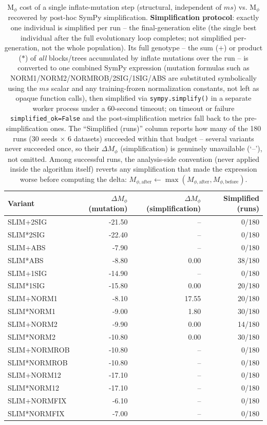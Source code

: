 \begin{table}[t]
\centering
\caption{M$_\phi$ cost of a single inflate-mutation step (structural, independent of $ms$) vs. M$_\phi$ recovered by post-hoc SymPy simplification. \textbf{Simplification protocol}: exactly one individual is simplified per run -- the final-generation elite (the single best individual after the full evolutionary loop completes; not simplified per-generation, not the whole population). Its full genotype -- the sum ($+$) or product ($*$) of \emph{all} blocks/trees accumulated by inflate mutations over the run -- is converted to one combined SymPy expression (mutation formulas such as NORM1/NORM2/NORMROB/2SIG/1SIG/ABS are substituted symbolically using the $ms$ scalar and any training-frozen normalization constants, not left as opaque function calls), then simplified via \texttt{sympy.simplify()} in a separate worker process under a 60-second timeout; on timeout or failure \texttt{simplified\_ok=False} and the post-simplification metrics fall back to the pre-simplification ones. The ``Simplified (runs)'' column reports how many of the 180 runs (30 seeds $\times$ 6 datasets) succeeded within that budget -- several variants never succeeded once, so their $\Delta M_\phi$ (simplification) is genuinely unavailable (`--'), not omitted. Among successful runs, the analysis-side convention (never applied inside the algorithm itself) reverts any simplification that made the expression worse before computing the delta: $M_{\phi,\mathrm{after}} \leftarrow \max(M_{\phi,\mathrm{after}}, M_{\phi,\mathrm{before}})$.}
\label{tab:mphi-mutation-simplification}
\begin{tabular}{lrrr}
\toprule
Variant & $\Delta M_\phi$ (mutation) & $\Delta M_\phi$ (simplification) & Simplified (runs) \\
\midrule
SLIM+2SIG & -21.50 & -- & 0/180 \\
SLIM*2SIG & -22.40 & -- & 0/180 \\
SLIM+ABS & -7.90 & -- & 0/180 \\
SLIM*ABS & -8.80 & 0.00 & 38/180 \\
SLIM+1SIG & -14.90 & -- & 0/180 \\
SLIM*1SIG & -15.80 & 0.00 & 20/180 \\
SLIM+NORM1 & -8.10 & 17.55 & 20/180 \\
SLIM*NORM1 & -9.00 & 1.80 & 30/180 \\
SLIM+NORM2 & -9.90 & 0.00 & 14/180 \\
SLIM*NORM2 & -10.80 & 0.00 & 30/180 \\
SLIM+NORMROB & -10.80 & -- & 0/180 \\
SLIM*NORMROB & -10.80 & -- & 0/180 \\
SLIM+NORM12 & -17.10 & -- & 0/180 \\
SLIM*NORM12 & -17.10 & -- & 0/180 \\
SLIM+NORMFIX & -6.10 & -- & 0/180 \\
SLIM*NORMFIX & -7.00 & -- & 0/180 \\
\bottomrule
\end{tabular}
\end{table}
